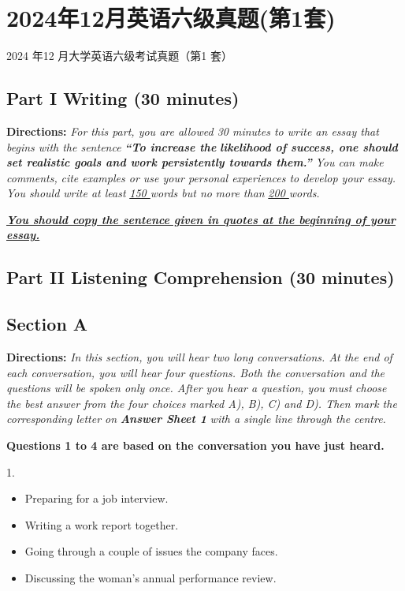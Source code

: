 \documentclass[UTF8,11pt]{ctexart}
\begin{document}
\section*{2024年12月英语六级真题(第1套)}
2024 年12 月大学英语六级考试真题（第1 套）


\subsection*{\textbf{Part I Writing} \textbf{(30 minutes)}}


\textbf{Directions:}\textit{ For this part, you are allowed 30 minutes to write an essay that begins with the sentence }\textbf{\textit{“To increase the}} \textbf{\textit{likelihood of success, one should set realistic goals and work persistently towards them.”}}\textit{ You can make comments,} \textit{cite examples or use your personal experiences to develop your essay. You should write at least }\textit{\uline{150 }}\textit{words but no} \textit{more than }\textit{\uline{200 }}\textit{words.}


\textbf{\textit{\uline{You should copy the sentence given in quotes at the beginning of your essay.}}}


\subsection*{\textbf{Part II} \textbf{Listening Comprehension} \textbf{(30 minutes)}}


\subsection*{\textbf{Section A}}


\textbf{Directions:} \textit{In this section, you will hear two long conversations. At the end of each conversation, you will hear four} \textit{questions. Both the conversation and the questions will be spoken only once. After you hear a question, you must} \textit{choose the best answer from the four choices marked A), B), C) and D). Then mark the corresponding letter on} \textbf{\textit{Answer Sheet 1}}\textit{ with a single line through the centre.}


\textbf{Questions 1 to 4 are based on the conversation you have just heard.}


1.


\begin{itemize}[leftmargin=2em,itemsep=.2em,topsep=.4em]\item[A.] Preparing for a job interview.
\item[B.] Writing a work report together.
\item[C.] Going through a couple of issues the company faces.
\item[D.] Discussing the woman’s annual performance review.
\end{itemize}
\end{document}
